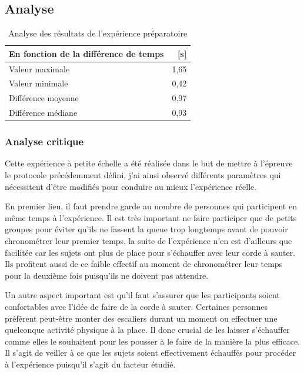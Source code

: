\documentclass[12pt,fleqn,oneside,french,openany]{book} %
\begin{document}
\subsection{Analyse} \label{ssec:analyse2.1}

\begin{table}[h]
	\centering
	\caption{Analyse des résultats de l'expérience préparatoire} \label{tbl:analyse2.1}
	\begin{tabular}{lr}
		\toprule 
		\textbf{En fonction de la différence de temps} & \textbf{[s]} \\ \midrule
		Valeur maximale & 1,65 \\
		Valeur minimale & 0,42 \\
		Différence moyenne & 0,97 \\
		Différence médiane & 0,93 \\ \bottomrule
	\end{tabular}
\end{table}

\subsubsection{Analyse critique} \label{sssec:analyseCrit2.1}
Cette expérience à petite échelle a été réalisée dans le but de mettre à l'épreuve le protocole précédemment défini, j'ai ainsi observé différents paramètres qui nécessitent d'être modifiés pour conduire au mieux l'expérience réelle. 

En premier lieu, il faut prendre garde au nombre de personnes qui participent en même temps à l'expérience. Il est très important ne faire participer que de petits groupes pour éviter qu'ils ne fassent la queue trop longtemps avant de pouvoir chronométrer leur premier temps, la suite de l'expérience n'en est d'ailleurs que facilitée car les sujets ont plus de place pour s'échauffer avec leur corde à sauter. Ils profitent aussi de ce faible effectif au moment de chronométrer leur temps pour la deuxième fois puisqu'ils ne doivent pas attendre.

Un autre aspect important est qu'il faut s'assurer que les participants soient confortables avec l'idée de faire de la corde à sauter. Certaines personnes préfèrent peut-être monter des escaliers durant un moment ou effectuer une quelconque activité physique à la place. Il donc crucial de les laisser s'échauffer comme elles le souhaitent pour les pousser à le faire de la manière la plus efficace. Il s'agit de veiller à ce que les sujets soient effectivement échauffés pour procéder à l'expérience puisqu'il s'agit du facteur étudié.
\end{document}
